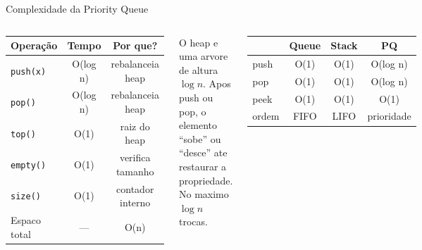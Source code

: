\documentclass[aspectratio=169,10pt]{beamer}
\begin{document}
\begin{frame}{Complexidade da Priority Queue}
  \begin{columns}[c]
      \begin{tcolorbox}[caixaRoxa,title={Tabela de Complexidade}]
        \centering\footnotesize
        \begin{tabular}{lcc}
          \toprule
          \textbf{Operação} & \textbf{Tempo} & \textbf{Por que?}\\
          \midrule
          \texttt{push(x)}  & O(log n) & rebalanceia heap\\
          \texttt{pop()}    & O(log n) & rebalanceia heap\\
          \texttt{top()}    & O(1)     & raiz do heap\\
          \texttt{empty()}  & O(1)     & verifica tamanho\\
          \texttt{size()}   & O(1)     & contador interno\\
          \midrule
          Espaco total      & ---      & O(n)\\
          \bottomrule
        \end{tabular}
      \end{tcolorbox}
      \vspace{0.1cm}
      \begin{tcolorbox}[caixaVerde,title={Intuição do O(log n)}]
        \small
        O heap e uma arvore de altura $\log n$.
        Apos push ou pop, o elemento ``sobe''
        ou ``desce'' ate restaurar a propriedade.
        No maximo $\log n$ trocas.
      \end{tcolorbox}
      \begin{tcolorbox}[caixaAmarelo,title={Comparação geral}]
        \footnotesize
        \begin{tabular}{lccc}
          \toprule
          & \textbf{Queue} & \textbf{Stack} & \textbf{PQ}\\
          \midrule
          push & O(1) & O(1) & O(log n)\\
          pop  & O(1) & O(1) & O(log n)\\
          peek & O(1) & O(1) & O(1)\\
          \midrule
          ordem & FIFO & LIFO & prioridade\\
          \bottomrule
        \end{tabular}

\end{tcolorbox}
\end{columns}
\end{frame}
\end{document}
